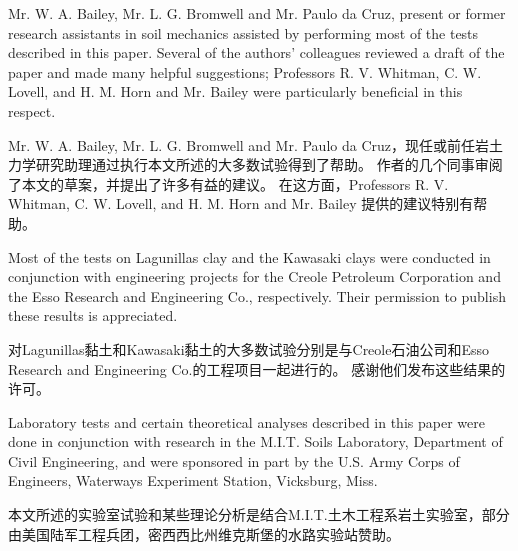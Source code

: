 \begin{paracol}{2}

    Mr. W. A. Bailey, Mr. L. G. Bromwell and Mr. Paulo da Cruz, present or former research assistants in soil mechanics assisted by performing most of the tests described in this paper. Several of the authors' colleagues reviewed a draft of the paper and made many helpful suggestions; Professors R. V. Whitman, C. W. Lovell, and H. M. Horn and Mr. Bailey were particularly beneficial in this respect.

    \switchcolumn

    Mr. W. A. Bailey, Mr. L. G. Bromwell and Mr. Paulo da Cruz，现任或前任岩土力学研究助理通过执行本文所述的大多数试验得到了帮助。 作者的几个同事审阅了本文的草案，并提出了许多有益的建议。 在这方面，Professors R. V. Whitman, C. W. Lovell, and H. M. Horn and Mr. Bailey 提供的建议特别有帮助。

    \switchcolumn*

    Most of the tests on Lagunillas clay and the Kawasaki clays were conducted in conjunction with engineering projects for the Creole Petroleum Corporation and the Esso Research and Engineering Co., respectively. Their permission to publish these results is appreciated.

    \switchcolumn
       
    对Lagunillas黏土和Kawasaki黏土的大多数试验分别是与Creole石油公司和Esso Research and Engineering Co.的工程项目一起进行的。 感谢他们发布这些结果的许可。

    \switchcolumn*

    Laboratory tests and certain theoretical analyses described in this paper were done in conjunction with research in the M.I.T. Soils Laboratory, Department of Civil Engineering, and were sponsored in part by the U.S. Army Corps of Engineers, Waterways Experiment Station, Vicksburg, Miss.

    \switchcolumn
       
    本文所述的实验室试验和某些理论分析是结合M.I.T.土木工程系岩土实验室，部分由美国陆军工程兵团，密西西比州维克斯堡的水路实验站赞助。
    
\end{paracol}